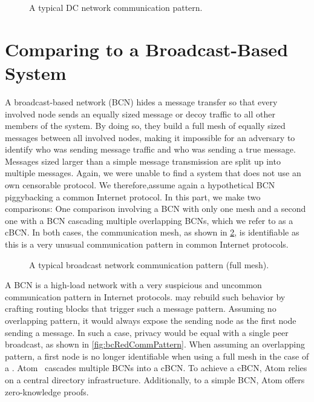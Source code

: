 \begin{figure}[ht]\centering
	
	\caption{A typical DC network communication pattern.}
	\label{fig:dcCommPattern}
\end{figure}


\section{Comparing \MessageVortex{} to a Broadcast-Based System}
A broadcast-based network (BCN) hides a message transfer so that every involved node sends an equally sized message or decoy traffic to all other members of the system. By doing so, they build a full mesh of equally sized messages between all involved nodes, making it impossible for an adversary to identify who was sending message traffic and who was sending a true message. Messages sized larger than a simple message transmission are split up into multiple messages. Again, we were unable to find a system that does not use an own censorable protocol. We therefore,assume again a hypothetical BCN piggybacking a common Internet protocol. In this part, we make two comparisons: One comparison involving a BCN with only one mesh and a second one with a BCN cascading multiple overlapping BCNs, which we refer to as a cBCN. In both cases, the communication mesh, as shown in \cref{fig:bcCommPattern}, is identifiable as this is a very unusual communication pattern in common Internet protocols.

\begin{figure}[ht]\centering
	
	\caption{A typical broadcast network communication pattern (full mesh).}
	\label{fig:bcCommPattern}
\end{figure}

A BCN is a high-load network with a very suspicious and uncommon communication pattern in Internet protocols. \MessageVortex{} may rebuild such behavior by crafting routing blocks that trigger such a message pattern. Assuming no overlapping pattern, it would always expose the sending node as the first node sending a message. In such a case, privacy would be equal with a single peer broadcast, as shown in \cref{fig:bcRedCommPattern}. When assuming an overlapping pattern, a first node is no longer identifiable when using a full mesh in the case of a \VortexMessage{}. Atom~\cite{kwon2016atom} cascades multiple BCNs into a cBCN. To achieve a cBCN, Atom relies on a central directory infrastructure. Additionally, to a simple BCN, Atom offers zero-knowledge proofs.

